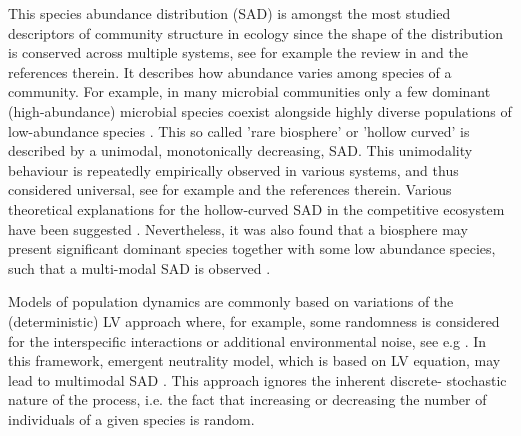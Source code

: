 \documentclass[%
 amsmath,amssymb,
reprint,%
linenumbers]{revtex4-2}
\begin{document}
This species abundance distribution (SAD) is amongst the most studied descriptors of community structure in ecology since the shape of the distribution is conserved across multiple systems, see for example the review in \cite{leidinger2017biodiversity} and the references therein.
It describes how abundance varies among species of a community. 
For example, in many microbial communities only a few dominant (high-abundance) microbial species coexist alongside highly diverse populations of low-abundance species \cite{lynch2015ecology}. 
This so called 'rare biosphere' or 'hollow curved' is described by a unimodal, monotonically decreasing,  SAD. 
This unimodality behaviour is repeatedly empirically observed in various systems, and thus considered universal, see for example \cite{mcgill2007species,magurran2013measuring} and the references therein. 
Various theoretical explanations for the hollow-curved SAD in the competitive ecosystem have been suggested \cite{mcgill2007species,magurran2013measuring}. 
Nevertheless, it was also found that a biosphere may present significant dominant species together with some low abundance species, such that a multi-modal SAD is observed  \cite{hanski1982dynamics,scheiner1997placing,loreau1999immigration,segura2013competition,zhang2020lifting,vergnon2012emergent}.  

Models of population dynamics are commonly based on variations of the (deterministic) LV approach where, for example, some randomness is considered for the interspecific interactions or additional environmental noise, see e.g \cite{fisher2014transition,lynch2015ecology,verberk2011explaining,fowler2013colonization,barabas2016effect,tilman1982resource,kessler2015generalized}. 
In this framework, emergent neutrality model, which is based on LV equation, may lead to multimodal SAD \cite{vergnon2012emergent,scheffer2006self}. 
This approach ignores the inherent discrete- stochastic nature of the process, i.e. the fact that increasing or decreasing the number of individuals of a given species is random.
\end{document}
